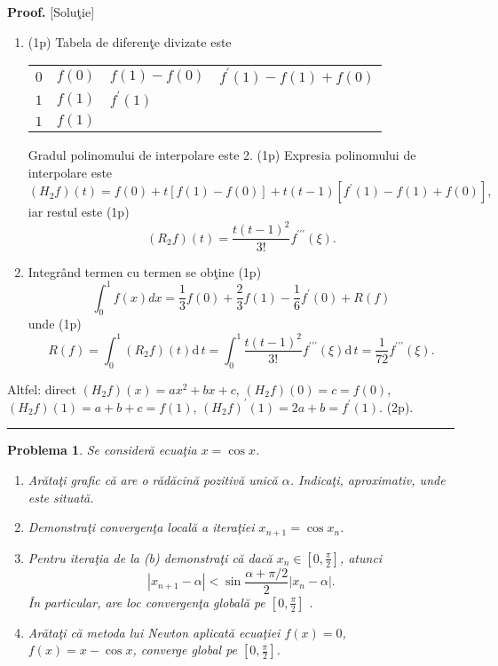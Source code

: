 \documentclass{article}%
\newtheorem{problem}[theorem]{Problema}
\newenvironment{proof}[1][Proof]{\noindent\textbf{#1.} }{\ \rule{0.5em}{0.5em}}
\begin{document}
\begin{proof}
[Solu\c{t}ie]

\begin{enumerate}
\item[(a)] (1p) Tabela de diferen\c{t}e divizate este%

\begin{tabular}
[c]{llll}%
$0$ & $f(0)$ & $f(1)-f(0)$ & $f^{\prime}(1)-f(1)+f(0)$\\
$1$ & $f(1)$ & $f^{\prime}(1)$ & \\
$1$ & $f(1)$ &  &
\end{tabular}


Gradul polinomului de interpolare este 2. (1p) Expresia polinomului de
interpolare este%
\[
(H_{2}f)(t)=f(0)+t\left[  f(1)-f(0)\right]  +t(t-1)\left[  f^{\prime
}(1)-f(1)+f(0)\right]  ,
\]
iar restul este (1p)%
\[
(R_{2}f)(t)=\frac{t(t-1)^{2}}{3!}f^{\prime\prime\prime}(\xi).
\]


\item[(b)] Integr\^{a}nd termen cu termen se ob\c{t}ine (1p)%
\[
\int_{0}^{1}f(x)dx=\frac{1}{3}f(0)+\frac{2}{3}f(1)-\frac{1}{6}f^{\prime
}(0)+R(f)
\]
unde (1p)%
\[
R(f)=\int_{0}^{1}(R_{2}f)(t)\mathrm{d}\,t=\int_{0}^{1}\frac{t(t-1)^{2}}%
{3!}f^{\prime\prime\prime}(\xi)\mathrm{d}\,t=\frac{1}{72}f^{\prime\prime
\prime}(\xi).
\]

\end{enumerate}

Altfel: direct $\left(  H_{2}f\right)  (x)=ax^{2}+bx+c$, $(H_{2}f)(0)=c=f(0)$,
$(H_{2}f)(1)=a+b+c=f(1)$, $(H_{2}f)^{\prime}(1)=2a+b=f^{\prime}(1)$. (2p).
\end{proof}

\begin{problem}
\label{pb5.21} Se consider\u{a} ecua\c{t}ia $x=\cos x$.

\begin{enumerate}
\item[(a)] Ar\u{a}ta\c{t}i grafic c\u{a} are o r\u{a}d\u{a}cin\u{a}
pozitiv\u{a} unic\u{a} $\alpha$. Indica\c{t}i, aproximativ, unde este situat\u{a}.

\item[(b)] Demonstra\c{t}i convergen\c{t}a local\u{a} a itera\c{t}iei
$x_{n+1}=\cos x_{n}$.

\item[(c)] Pentru itera\c{t}ia de la (b) demonstra\c{t}i c\u{a} dac\u{a}
$x_{n}\in\left[  0,\frac{\pi}{2}\right]  $, atunci%
\[
\left\vert x_{n+1}-\alpha\right\vert <\sin\frac{\alpha+\pi/2}{2}\left\vert
x_{n}-\alpha\right\vert .
\]
\^{I}n particular, are loc convergen\c{t}a global\u{a} pe $\left[  0,\frac
{\pi}{2}\right]  $ .

\item[(d)] Ar\u{a}ta\c{t}i c\u{a} metoda lui Newton aplicat\u{a} ecua\c{t}iei
$f\left(  x\right)  =0$, $f(x)=x-\cos x$, converge global pe $\left[
0,\frac{\pi}{2}\right]  $.
\end{enumerate}
\end{problem}
\end{document}
